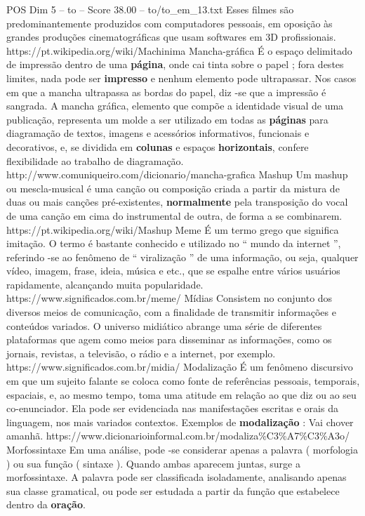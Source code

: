 \begin{textsample}{POS Dim 5 – to – Score 38.00 – to/to\_em\_13.txt}
Esses filmes são predominantemente produzidos com computadores pessoais, em oposição às grandes produções cinematográficas que usam softwares em 3D profissionais. https://pt.wikipedia.org/wiki/Machinima Mancha-gráfica É o espaço delimitado de impressão dentro de uma \textbf{página}, onde cai tinta sobre o papel ; fora destes limites, nada pode ser \textbf{impresso} e nenhum elemento pode ultrapassar.
Nos casos em que a mancha ultrapassa as bordas do papel, diz -se que a impressão é sangrada.
A mancha gráfica, elemento que compõe a identidade visual de uma publicação, representa um molde a ser utilizado em todas as \textbf{páginas} para diagramação de textos, imagens e acessórios informativos, funcionais e decorativos, e, se dividida em \textbf{colunas} e espaços \textbf{horizontais}, confere flexibilidade ao trabalho de diagramação. http://www.comuniqueiro.com/dicionario/mancha-grafica Mashup Um mashup ou mescla-musical é uma canção ou composição criada a partir da mistura de duas ou mais canções pré-existentes, \textbf{normalmente} pela transposição do vocal de uma canção em cima do instrumental de outra, de forma a se combinarem. https://pt.wikipedia.org/wiki/Mashup Meme É um termo grego que significa imitação.
O termo é bastante conhecido e utilizado no “ mundo da internet ”, referindo -se ao fenômeno de “ viralização ” de uma informação, ou seja, qualquer vídeo, imagem, frase, ideia, música e etc., que se espalhe entre vários usuários rapidamente, alcançando muita popularidade. https://www.significados.com.br/meme/ Mídias Consistem no conjunto dos diversos meios de comunicação, com a finalidade de transmitir informações e conteúdos variados.
O universo midiático abrange uma série de diferentes plataformas que agem como meios para disseminar as informações, como os jornais, revistas, a televisão, o rádio e a internet, por exemplo. https://www.significados.com.br/midia/ Modalização É um fenômeno discursivo em que um sujeito falante se coloca como fonte de referências pessoais, temporais, espaciais, e, ao mesmo tempo, toma uma atitude em relação ao que diz ou ao seu co-enunciador.
Ela pode ser evidenciada nas manifestações escritas e orais da linguagem, nos mais variados contextos.
Exemplos de \textbf{modalização} : Vai chover amanhã. https://www.dicionarioinformal.com.br/modaliza\%C3\%A7\%C3\%A3o/ Morfossintaxe Em uma análise, pode -se considerar apenas a palavra ( morfologia ) ou sua função ( sintaxe ).
Quando ambas aparecem juntas, surge a morfossintaxe.
A palavra pode ser classificada isoladamente, analisando apenas sua classe gramatical, ou pode ser estudada a partir da função que estabelece dentro da \textbf{oração}.

\end{textsample}
